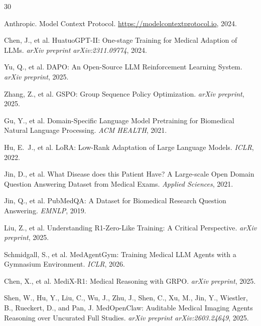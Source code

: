 \documentclass{article}
\begin{document}
\begin{thebibliography}{30}

Anthropic.
\newblock Model Context Protocol.
\newblock \url{https://modelcontextprotocol.io}, 2024.

Chen, J., et al.
\newblock HuatuoGPT-II: One-stage Training for Medical Adaption of LLMs.
\newblock \emph{arXiv preprint arXiv:2311.09774}, 2024.

Yu, Q., et al.
\newblock DAPO: An Open-Source LLM Reinforcement Learning System.
\newblock \emph{arXiv preprint}, 2025.

Zhang, Z., et al.
\newblock GSPO: Group Sequence Policy Optimization.
\newblock \emph{arXiv preprint}, 2025.

Gu, Y., et al.
\newblock Domain-Specific Language Model Pretraining for Biomedical Natural Language Processing.
\newblock \emph{ACM HEALTH}, 2021.

Hu, E.~J., et al.
\newblock LoRA: Low-Rank Adaptation of Large Language Models.
\newblock \emph{ICLR}, 2022.

Jin, D., et al.
\newblock What Disease does this Patient Have? A Large-scale Open Domain Question Answering Dataset from Medical Exams.
\newblock \emph{Applied Sciences}, 2021.

Jin, Q., et al.
\newblock PubMedQA: A Dataset for Biomedical Research Question Answering.
\newblock \emph{EMNLP}, 2019.

Liu, Z., et al.
\newblock Understanding R1-Zero-Like Training: A Critical Perspective.
\newblock \emph{arXiv preprint}, 2025.

Schmidgall, S., et al.
\newblock MedAgentGym: Training Medical LLM Agents with a Gymnasium Environment.
\newblock \emph{ICLR}, 2026.

Chen, X., et al.
\newblock MediX-R1: Medical Reasoning with GRPO.
\newblock \emph{arXiv preprint}, 2025.

Shen, W., Hu, Y., Liu, C., Wu, J., Zhu, J., Shen, C., Xu, M., Jin, Y., Wiestler, B., Rueckert, D., and Pan, J.
\newblock MedOpenClaw: Auditable Medical Imaging Agents Reasoning over Uncurated Full Studies.
\newblock \emph{arXiv preprint arXiv:2603.24649}, 2025.


\end{thebibliography}
\end{document}
